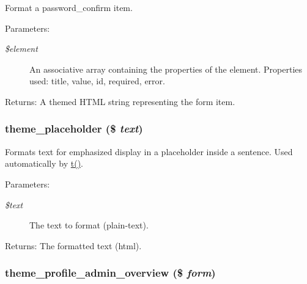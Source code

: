 Format a password\_\-confirm item.

\begin{Desc}
\item[Parameters:]
\begin{description}
\item[{\em \$element}]An associative array containing the properties of the element. Properties used: title, value, id, required, error. \end{description}
\end{Desc}
\begin{Desc}
\item[Returns:]A themed HTML string representing the form item. \end{Desc}
\hypertarget{group__themeable_gc300e87edb69de9245c38a1d09c66adc}{
\subsubsection[{theme\_\-placeholder}]{\setlength{\rightskip}{0pt plus 5cm}theme\_\-placeholder (\$ {\em text})}}
\label{group__themeable_gc300e87edb69de9245c38a1d09c66adc}


Formats text for emphasized display in a placeholder inside a sentence. Used automatically by \hyperlink{common_8inc_41d20f0c822bf1f3c26a97981c762665}{t()}.

\begin{Desc}
\item[Parameters:]
\begin{description}
\item[{\em \$text}]The text to format (plain-text). \end{description}
\end{Desc}
\begin{Desc}
\item[Returns:]The formatted text (html). \end{Desc}
\hypertarget{group__themeable_g66e427cb630bfec91b54a2f686d68aa4}{
\subsubsection[{theme\_\-profile\_\-admin\_\-overview}]{\setlength{\rightskip}{0pt plus 5cm}theme\_\-profile\_\-admin\_\-overview (\$ {\em form})}}
\label{group__themeable_g66e427cb630bfec91b54a2f686d68aa4}


